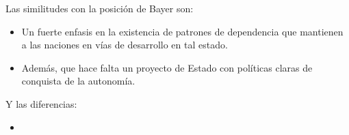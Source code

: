  Las similitudes con la posición de Bayer son:

 \begin{itemize}
     \item Un fuerte enfasis en la existencia de patrones de dependencia que mantienen a las naciones en vías de desarrollo en tal estado.
     \item Además, que hace falta un proyecto de Estado con políticas claras de conquista de la autonomía.
 \end{itemize}

 Y las diferencias:

 \begin{itemize}
     \item
 \end{itemize}
